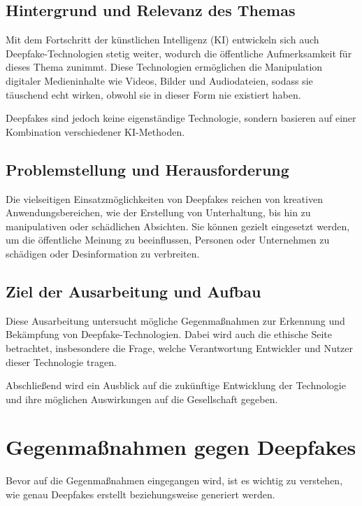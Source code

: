 \documentclass[a4paper,12pt]{article}
\begin{document}
\subsection{Hintergrund und Relevanz des Themas}
Mit dem Fortschritt der künstlichen Intelligenz (KI) entwickeln sich auch Deepfake-Technologien stetig weiter, wodurch die öffentliche Aufmerksamkeit für dieses Thema zunimmt. Diese Technologien ermöglichen die Manipulation digitaler Medieninhalte wie Videos, Bilder und Audiodateien, sodass sie täuschend echt wirken, obwohl sie in dieser Form nie existiert haben.

Deepfakes sind jedoch keine eigenständige Technologie, sondern basieren auf einer Kombination verschiedener KI-Methoden. \cite{BVDW2024}\\

\subsection{Problemstellung und Herausforderung}
Die vielseitigen Einsatzmöglichkeiten von Deepfakes reichen von kreativen Anwendungsbereichen, wie der Erstellung von Unterhaltung, bis hin zu manipulativen oder schädlichen Absichten. Sie können gezielt eingesetzt werden, um die öffentliche Meinung zu beeinflussen, Personen oder Unternehmen zu schädigen oder Desinformation zu verbreiten.\cite{CounterExtremism2020}\\

\subsection{Ziel der Ausarbeitung und Aufbau}
Diese Ausarbeitung untersucht mögliche Gegenmaßnahmen zur Erkennung und Bekämpfung von Deepfake-Technologien. Dabei wird auch die ethische Seite betrachtet, insbesondere die Frage, welche Verantwortung Entwickler und Nutzer dieser Technologie tragen.  

Abschließend wird ein Ausblick auf die zukünftige Entwicklung der Technologie und ihre möglichen Auswirkungen auf die Gesellschaft gegeben.
\newpage

\section{Gegenmaßnahmen gegen Deepfakes}
Bevor auf die Gegenmaßnahmen eingegangen wird, ist es wichtig zu verstehen, wie genau Deepfakes erstellt beziehungsweise generiert werden.  
\end{document}
